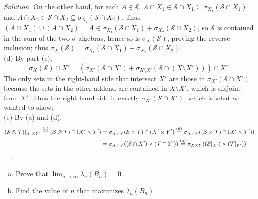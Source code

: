 \documentclass[10pt]{article}
\providecommand{\ii}{\item}
\newenvironment{soln}{\begin{proof}[Solution]}{\end{proof}}
\begin{document}
\begin{soln}
    On the other hand, for each $A\in\mathcal S$,
    $A\cap X_1\in\mathcal S\cap X_1\subseteq\sigma_{X_1}(\mathcal S\cap X_1)$ and
    $A\cap X_2\in\mathcal S\cap X_2\subseteq\sigma_{X_2}(\mathcal S\cap X_2)$.
    Thus $(A\cap X_1)\cup(A\cap X_2) = A\in
    \sigma_{X_1}(\mathcal S\cap X_1) + \sigma_{X_2}(\mathcal S\cap X_2)$,
    so $\mathcal S$ is contained in the sum of the two $\sigma$-algebras,
    hence so is $\sigma_X(\mathcal S)$, proving the reverse inclusion;
    thus $\sigma_X(\mathcal S) = \sigma_{X_1}(\mathcal S\cap X_1)
    + \sigma_{X_2}(\mathcal S\cap X_2)$.
    \\

    (d) By part (c),
    \begin{equation*}
        \sigma_X(\mathcal S)\cap X' =
	(\sigma_{X'}(\mathcal S\cap X') +
	\sigma_{X\setminus X'}(\mathcal S\cap(X\setminus X')))\cap X'.
    \end{equation*}
    The only sets in the right-hand side that intersect $X'$
    are those in $\sigma_{X'}(\mathcal S\cap X')$
    because the sets in the other addend are contained in
    $X\setminus X'$, which is disjoint from $X'$. Thus the right-hand side
    is exactly $\sigma_{X'}(\mathcal S\cap X')$, which is what we wanted to show.
    \\

    (e) By (a) and (d),
    \begin{align*}
	(\mathcal S\otimes\mathcal T)|_{X'\times Y'}
	\overset{\text{(a)}}= (\mathcal S\otimes\mathcal T)\cap(X'\times Y')
	&= \sigma_{X\times Y}(\mathcal S\times\mathcal T)\cap(X'\times Y')
	\overset{\text{(d)}}=
	\sigma_{X\times Y}((\mathcal S\times\mathcal T)\cap(X'\times Y'))\\
	&= \sigma_{X\times Y}((\mathcal S\cap X')\times(\mathcal T\cap Y'))
	\overset{\text{(a)}}=
	\sigma_{X\times Y}((\mathcal S|_{X'})\times(\mathcal T|_{Y'})).\qedhere
    \end{align*}
\end{soln}

\begin{problem}
    [Axler 5C \#12]
    \begin{enumerate}[(a)]
	\ii Prove that $\lim_{n\to\infty}\lambda_n(B_n) = 0$.
	\ii Find the value of $n$ that maximizes $\lambda_n(B_n)$.
    \end{enumerate}
\end{problem}
\end{document}
